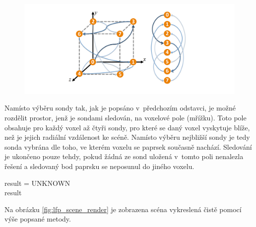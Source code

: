 \begin{figure}[H]
	\centering
	\includegraphics[scale=1]{images/probe_cube.png}
	\captionsetup{justification=centering}
	\label{fig:lfp_cube}
\end{figure}

Namísto výběru sondy tak, jak je popsáno v~předchozím odstavci, je možné rozdělit prostor, jenž je sondami sledován, na voxelové pole (mřížku). Toto pole obsahuje pro každý voxel až čtyři sondy, pro které se daný voxel vyskytuje blíže, než je jejich radiální vzdálenost ke scéně. Namísto výběru nejbližší sondy je tedy sonda vybrána dle toho, ve kterém voxelu se paprsek současně nachází. Sledování je ukončeno pouze tehdy, pokud žádná ze sond uložená v~tomto poli nenalezla řešení a sledovaný bod paprsku se neposunul do jiného voxelu.

\begin{center}
	\begin{czechalgorithm}[H] \label{alg:light_field_trace}
	    result = UNKNOWN\\
	    \KwRet result
		\caption{Sledování paprsku skrze light field}
	\end{czechalgorithm}
\end{center}

Na obrázku \ref{fig:lfp_scene_render} je zobrazena scéna vykreslená čistě pomocí výše popsané metody.


